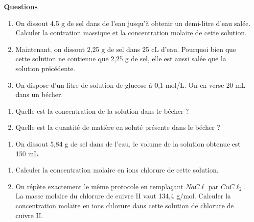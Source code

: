 \documentclass[
]{book}
\providecommand{\tightlist}{%
  \setlength{\itemsep}{0pt}\setlength{\parskip}{0pt}}
\def\tightlist{}
\begin{document}
\begin{blackbox}

\begin{center}
\textbf{Questions}

\end{center}

\begin{enumerate}
\def\labelenumi{\arabic{enumi}.}
\tightlist
\item
  On dissout 4,5 g de sel dans de l'eau jusqu'à obtenir un demi-litre d'eau salée. Calculer la contration massique et la concentration molaire de cette solution.
\item
  Maintenant, on dissout 2,25 g de sel dans 25 cL d'eau. Pourquoi bien que cette solution ne contienne que 2,25 g de sel, elle est aussi salée que la solution précédente.
\item
  On dispose d'un litre de solution de glucose à 0,1 mol/L. On en verse 20 mL dans un bécher.
\end{enumerate}

\begin{enumerate}
\def\labelenumi{\alph{enumi}.}
\tightlist
\item
  Quelle est la concentration de la solution dans le bécher ?
\item
  Quelle est la quantité de matière en soluté présente dans le bécher ?
\end{enumerate}

\begin{enumerate}
\def\labelenumi{\arabic{enumi}.}
\setcounter{enumi}{3}
\tightlist
\item
  On dissout 5,84 g de sel dans de l'eau, le volume de la solution obtenue est 150 mL.
\end{enumerate}

\begin{enumerate}
\def\labelenumi{\alph{enumi}.}
\tightlist
\item
  Calculer la concentration molaire en ions chlorure de cette solution.
\item
  On répète exactement le même protocole en remplaçant \(NaC\ell\) par \(CuC\ell_2\). La masse molaire du chlorure de cuivre II vaut 134,4 g/mol. Calculer la concentration molaire en ions chlorure dans cette solution de chlorure de cuivre II.
\end{enumerate}

\end{blackbox}
\end{document}
